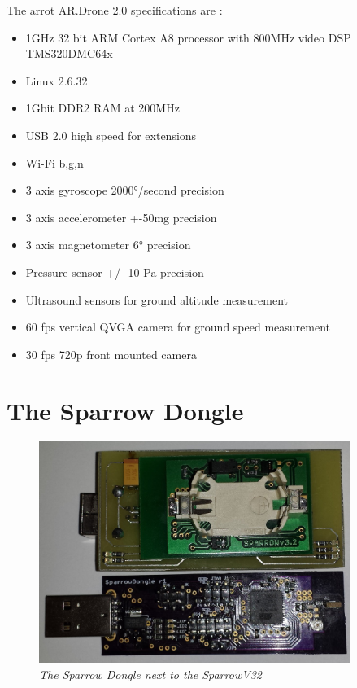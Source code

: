 The arrot AR.Drone 2.0 specifications are :
\begin{itemize}



\item   1GHz 32 bit ARM Cortex A8 processor with 800MHz video DSP TMS320DMC64x
\item   Linux 2.6.32
\item   1Gbit DDR2 RAM at 200MHz
\item   USB 2.0 high speed for extensions
\item   Wi-Fi b,g,n
\item   3 axis gyroscope 2000°/second precision
\item   3 axis accelerometer +-50mg precision
\item   3 axis magnetometer 6° precision
\item   Pressure sensor +/- 10 Pa precision
\item   Ultrasound sensors for ground altitude measurement
\item   60 fps vertical QVGA camera for ground speed measurement
\item	30 fps 720p front mounted camera 	

\end{itemize}



\clearpage

\section{The Sparrow Dongle}

\begin{figure}[ht]
\begin{center}
\includegraphics[width=0.9\textwidth]{hw_platform/sparrow.jpg}
\end{center}
\caption{\small \itshape{The Sparrow Dongle next to the SparrowV32}}
\end{figure}


